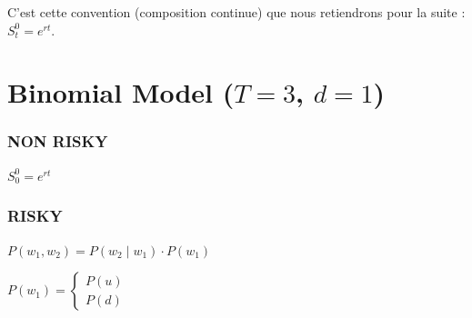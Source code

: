 C'est cette convention (composition continue) que nous retiendrons pour la suite : $S^0_t = e^{rt}$.

\section{Binomial Model ($T=3$, $d=1$)}

\subsubsection*{NON RISKY}
$S_0^0 = e^{rt}$

\subsubsection*{RISKY}
$P(w_1, w_2) = P(w_2 \mid w_1) \cdot P(w_1)$

$P(w_1) = \begin{cases}
P(u) \\
P(d)
\end{cases}$

\vspace{1cm}

